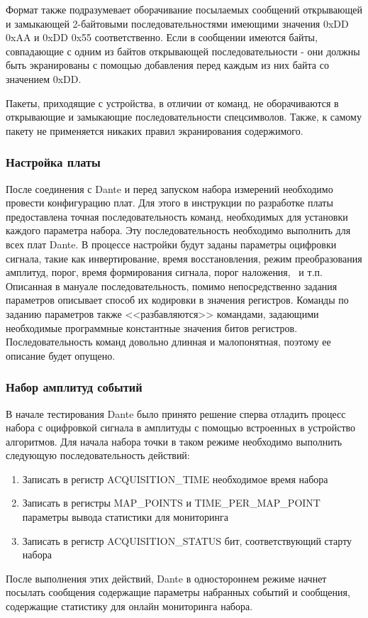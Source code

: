 \documentclass[a4paper,14pt]{extreport}
\begin{document}
Формат также подразумевает оборачивание посылаемых сообщений открывающей и замыкающей 2-байтовыми последовательностями имеющими значения 0xDD 0xAA и 0xDD 0x55 соответственно. Если в сообщении имеются байты, совпадающие с одним из байтов открывающей последовательности - они должны быть экранированы с помощью добавления перед каждым из них байта со значением 0xDD.

Пакеты, приходящие с устройства, в отличии от команд, не оборачиваются в открывающие и замыкающие последовательности спецсимволов. Также, к самому пакету не применяется никаких правил экранирования содержимого.

\subsubsection{Настройка платы}

После соединения с Dante и перед запуском набора измерений необходимо провести конфигурацию плат. Для этого в инструкции по разработке платы предоставлена точная последовательность команд, необходимых для установки каждого параметра набора. Эту последовательность необходимо выполнить для всех плат Dante. В процессе настройки будут заданы параметры оцифровки сигнала, такие как инвертирование, время восстановления, режим преобразования амплитуд, порог, время формирования сигнала, порог наложения, ~и т.п. Описанная в мануале последовательность, помимо непосредственно задания параметров описывает способ их кодировки в значения регистров. Команды по заданию параметров также <<разбавляются>> командами, задающими необходимые программные константные значения битов регистров. Последовательность команд довольно длинная и малопонятная, поэтому ее описание будет опущено.

\subsubsection{Набор амплитуд событий}

В начале тестирования Dante было принято решение сперва отладить процесс набора с оцифровкой сигнала в амплитуды с помощью встроенных в устройство алгоритмов. Для начала набора точки в таком режиме необходимо выполнить следующую последовательность действий:

\begin{enumerate}
    \item Записать в регистр ACQUISITION\_TIME необходимое время набора
    \item Записать в регистры MAP\_POINTS и TIME\_PER\_MAP\_POINT параметры вывода статистики для мониторинга
    \item Записать в регистр ACQUISITION\_STATUS бит, соответствующий старту набора
\end{enumerate}
После выполнения этих действий, Dante в одностороннем режиме начнет посылать сообщения содержащие параметры набранных событий и сообщения, содержащие статистику для онлайн мониторинга набора.
\end{document}
